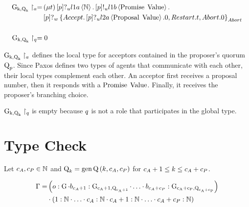 \begin{align*}
\operatorname{G_{k, \operatorname{Q}_{k}}} \upharpoonright_{a} =
&
    \left(\mu t\right)
    \left[p\right]?_u l1a \left\langle \mathbb{N} \right\rangle .
    \left[p\right]!_u l1b \left\langle \operatorname{Promise}\; \operatorname{Value} \right\rangle .
    \\
&
    \left[p\right]?_w \left\{
        \mathnormal{Accept} .
            \left[p\right]?_u l2a \left\langle \operatorname{Proposal}\; \operatorname{Value} \right\rangle.
            0
        ,\mathnormal{Restart} .
            t
        ,\mathnormal{Abort} .
            0
    \right\}_{\mathnormal{Abort}}\\\\
\operatorname{G_{k, \operatorname{Q}_{k}}} \upharpoonright_{q} =&\; 0
\end{align*}

$\operatorname{G_{k, \operatorname{Q}_{k}}} \upharpoonright_{a}$ defines the local type for acceptors contained in the proposer's quorum $\operatorname{Q}_{p}$.
Since Paxos defines two types of agents that communicate with each other, their local types complement each other.
An acceptor first receives a proposal number, then it responds with a $\operatorname{Promise}\; \operatorname{Value}$.
Finally, it receives the proposer's branching choice.

$\operatorname{G_{k, \operatorname{Q}_{k}}} \upharpoonright_{q}$ is empty because $q$ is not a role that participates in the global type.

\section{Type Check}
Let $c_A,c_P\in\mathbb{N}$ and $\operatorname{Q}_{k} = \operatorname{gen\operatorname{Q}}\left(k, c_A, c_P\right)$ for $c_A + 1 \leq k \leq c_A + c_P$.

\begin{align*}
\Gamma =
    &\left(
    o:\operatorname{G}
    \cdot b_{c_A+1}:\operatorname{G_{c_A+1, \operatorname{Q}_{c_A+1}}} \cdot \ldots
    \cdot b_{c_A+c_P}:\operatorname{G_{c_A+c_P, \operatorname{Q}_{c_A+c_P}}}
    \right)\\
&\cdot
    \left(
    1:\mathbb{N}
    \cdot \ldots
    \cdot c_A:\mathbb{N}
    \cdot c_A + 1:\mathbb{N}
    \cdot \ldots
    \cdot c_A + c_P:\mathbb{N}
    \right)
\end{align*}

